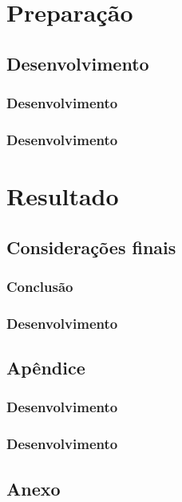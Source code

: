 \documentclass{Arquivos/AcademicoPadrao}
\begin{document}
\part{Preparação} %
\chapter{Desenvolvimento}
\section{Desenvolvimento}
\section{Desenvolvimento}

\part{Resultado} %
\chapter{Considerações finais}
\section{Conclusão}
\section{Desenvolvimento}

\postextual %


\printbibliography[heading=none]


\inicioApendices
\chapter{Apêndice}
\section{Desenvolvimento}
\section{Desenvolvimento}

\inicioAnexos
\chapter{Anexo}
\end{document}

